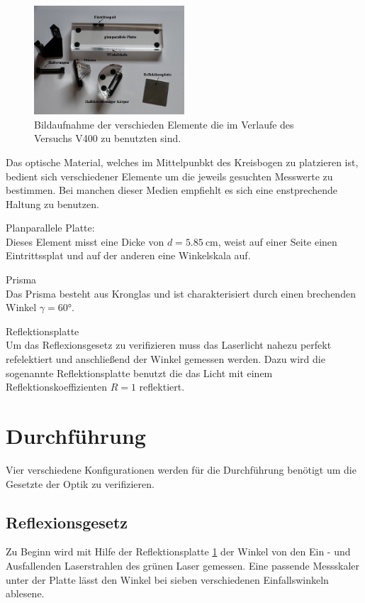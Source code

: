 \begin{figure}
    \centering
    \includegraphics[width=0.5\textwidth]{bilder/teile.png}
    \caption{Bildaufnahme der verschieden Elemente die im Verlaufe des Versuchs V400 zu benutzten sind. \cite{skript}} 
    \label{fig:teile}
\end{figure}
\FloatBarrier

Das optische Material, welches im Mittelpunbkt des Kreisbogen zu platzieren ist, bedient sich verschiedener Elemente um 
die jeweils gesuchten Messwerte zu bestimmen. Bei manchen dieser Medien empfiehlt es sich eine enstprechende Haltung zu benutzen.
\begin{description}
    \item Planparallele Platte: \\
    Dieses Element misst eine Dicke von $d = \SI{5.85}{\cm}$, weist auf einer Seite einen Eintrittssplat und auf der anderen 
    eine Winkelskala auf.
    \item Prisma \\
    Das Prisma besteht aus Kronglas und ist charakterisiert durch einen brechenden Winkel $\gamma = 60 \si{\degree}$.
    \item Reflektionsplatte \label{lol}\\ 
    Um das Reflexionsgesetz zu verifizieren muss das Laserlicht nahezu perfekt refelektiert und anschließend der Winkel
    gemessen werden. Dazu wird die sogenannte Reflektionsplatte benutzt die das Licht mit einem Reflektionskoeffizienten $R= 1$
    reflektiert.
\end{description}
\newpage
\section{Durchführung}
Vier verschiedene Konfigurationen werden für die Durchführung benötigt um die Gesetzte der Optik zu verifizieren.

\subsection{Reflexionsgesetz}
Zu Beginn wird mit Hilfe der Reflektionsplatte \ref{fig:teile} der Winkel von den Ein - und Ausfallenden Laserstrahlen des grünen Laser gemessen. 
Eine passende Messskaler unter der Platte lässt den Winkel bei sieben verschiedenen Einfallswinkeln ablesene.

